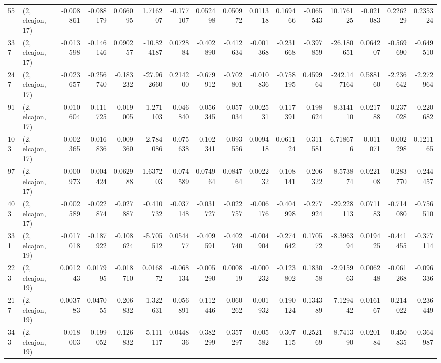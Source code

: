 \begin{tabular}{llrrrrrrrrrrrrrr}
55  &  (2, elcajon, 17) &  -0.008861 & -0.088179 &  0.066095 &   1.716207 & -0.177107 &   0.052498 &  0.050972 &  0.011318 &  0.169466 & -0.065543 &    10.176125 &  -0.021083 &   0.226229 &   0.235324 \\
337 &  (2, elcajon, 17) &  -0.013598 & -0.146146 &  0.090257 & -10.824187 &  0.072884 &  -0.402890 & -0.412634 & -0.001368 & -0.231668 & -0.397859 &   -26.180651 &   0.064207 &  -0.569690 &  -0.649510 \\
247 &  (2, elcajon, 17) &  -0.023657 & -0.256740 & -0.183232 & -27.962660 &  0.214200 &  -0.679912 & -0.702801 & -0.010836 & -0.758195 &  0.459964 &  -242.147164 &   0.588160 &  -2.236642 &  -2.272964 \\
91  &  (2, elcajon, 17) &  -0.010604 & -0.111725 & -0.019005 &  -1.271103 & -0.046840 &  -0.056345 & -0.057034 &  0.002531 & -0.117391 & -0.198624 &    -8.314110 &   0.021788 &  -0.237028 &  -0.220682 \\
103 &  (2, elcajon, 17) &  -0.002365 & -0.016836 & -0.009360 &  -2.784086 & -0.075638 &  -0.102341 & -0.093556 &  0.009418 &  0.061124 & -0.311581 &     6.718676 &  -0.011071 &  -0.002298 &   0.121165 \\
97  &  (2, elcajon, 17) &  -0.000973 & -0.004424 &  0.062988 &   1.637203 & -0.074589 &   0.074964 &  0.084764 &  0.002232 & -0.108141 & -0.206322 &    -8.573874 &   0.022108 &  -0.283770 &  -0.244457 \\
403 &  (2, elcajon, 17) &  -0.002589 & -0.022874 & -0.027887 &  -0.410732 & -0.037148 &  -0.031727 & -0.022757 & -0.006176 & -0.404998 & -0.277924 &   -29.228113 &   0.071183 &  -0.714080 &  -0.756510 \\
331 &  (2, elcajon, 19) &  -0.017018 & -0.187922 & -0.108624 &  -5.705512 &  0.054477 &  -0.409591 & -0.402740 & -0.004904 & -0.274642 &  0.170572 &    -8.396394 &   0.019425 &  -0.441455 &  -0.377114 \\
223 &  (2, elcajon, 19) &   0.001243 &  0.017995 & -0.018710 &   0.016872 & -0.068134 &  -0.005290 &  0.000819 & -0.000232 & -0.123802 &  0.183058 &    -2.915963 &   0.006248 &  -0.061268 &  -0.096336 \\
217 &  (2, elcajon, 19) &   0.003783 &  0.047055 & -0.206832 &  -1.322631 & -0.056891 &  -0.112446 & -0.060262 & -0.001932 & -0.190124 &  0.134389 &    -7.129442 &   0.016167 &  -0.214022 &  -0.236449 \\
343 &  (2, elcajon, 19) &  -0.018003 & -0.199052 & -0.126832 &  -5.111117 &  0.044836 &  -0.382299 & -0.357297 & -0.005582 & -0.307115 &  0.252169 &    -8.741390 &   0.020184 &  -0.450835 &  -0.364987 \\

\end{tabular}
